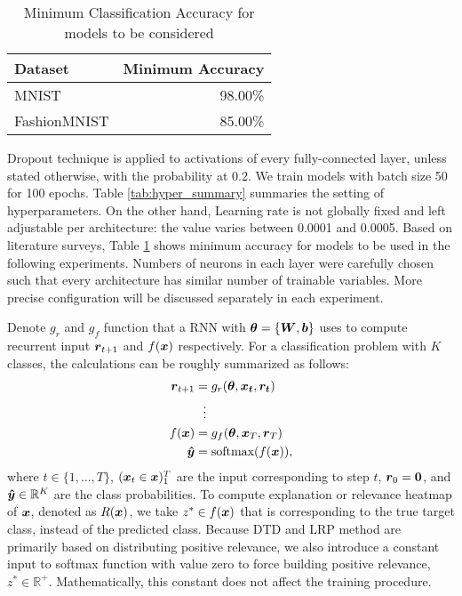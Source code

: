 \begin{table}[h]
\centering
\begin{tabular}{ll}
\multicolumn{1}{l|}{\textbf{Dataset}} & \textbf{Minimum Accuracy} \\ \hline
\multicolumn{1}{l|}{MNIST}            & \multicolumn{1}{r}{98.00\%}  \\
\multicolumn{1}{l|}{FashionMNIST}    & \multicolumn{1}{r}{85.00\%}  \\
\end{tabular}
\caption{Minimum Classification Accuracy for models to be considered}
\label{tab:min_acc}
\end{table}



Dropout technique \cite{SrivastavaDropoutSimpleWay2014} is applied to activations of every fully-connected layer, unless stated otherwise,  with the probability at 0.2. We train models with batch size 50 for 100 epochs. Table \ref{tab:hyper_summary} summaries the setting of hyperparameters. On the other hand, Learning rate is not globally fixed and left adjustable per architecture: the value varies between 0.0001 and 0.0005. Based on literature surveys, Table \ref{tab:min_acc} shows minimum accuracy for models to be used in the following experiments.  Numbers of neurons in each layer were carefully chosen such that every architecture has similar number of trainable variables. More precise configuration will be discussed separately in each experiment. 

Denote $g_r$ and $g_{f}$ function that a RNN with $\boldsymbol{\theta} = \{ \patmatrix{W}, \boldsymbol{b} \}$ uses to compute recurrent input $\patvector{r}_{t+1}$ and $f(\boldsymbol{x})$ respectively. For a classification problem with $K$ classes, the calculations can be  roughly summarized as follows: 
 \begin{align*}
 	\patvector{r}_{t+1} &= g_r(\patvector{\theta}, \patvector{x_t}, \patvector{r_t}) \\
 	 &\ \ \vdots\\
f(\x) &= g_{f}(\patvector{\theta}, \patvector{x}_{T},  \patvector{r}_{T}) \\
 	\patvector{\hat{y}} &= \text{softmax}(f(\x)),
 \end{align*}
 where $t \in \{1, \dots, T\}$, $(\boldsymbol{x}_t \in \boldsymbol{x})_1^{T}$ are the input corresponding to  step $t$, $\patvector{r}_0 = \patvector{0}$, and $\patvector{\hat{y}} \in \mathbb{R}^K$ are the class probabilities. To compute explanation or relevance heatmap of $\boldsymbol{x}$, denoted as $R(\boldsymbol{x})$, we take $z^* \in f(\boldsymbol{x})$ that is corresponding to the true target class, instead of the predicted class.  Because DTD and LRP method are primarily  based on distributing positive relevance, we also introduce a constant input to softmax function with value zero to force building positive relevance, $z^* \in \mathbb{R}^+$. Mathematically, this constant does not affect the training procedure.

